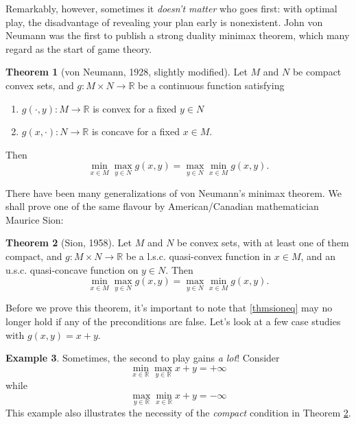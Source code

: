 \documentclass{article}
\numberwithin{equation}{section}
\theoremstyle{definition}
\newtheorem{theorem}{Theorem}[section]
\newtheorem{example}[theorem]{Example}
\newcommand{\bR}{\mathbb{R}}
\begin{document}
Remarkably, however, sometimes it \textit{doesn't matter} who goes first: with optimal play, the disadvantage of revealing your plan early is nonexistent. John von Neumann was the first to publish a strong duality minimax theorem, which many regard as the start of game theory.
\begin{theorem}[von Neumann, 1928, slightly modified]
    Let $M$ and $N$ be compact convex sets, and $g:M\times N\to\bR$ be a continuous function satisfying
    \begin{enumerate}[label=(\roman*)]
        \item $g(\cdot, y):M\to\bR$ is convex for a fixed $y\in N$
        \item $g(x, \cdot):N\to\bR$ is concave for a fixed $x\in M$.
    \end{enumerate}
    \vspace{0.8\baselineskip}Then
    \begin{equation}
        \min_{x\in M}\max_{y\in N} g(x,y)= \max_{y\in N}\min_{x\in M} g(x,y).
    \end{equation}
\end{theorem}
There have been many generalizations of von Neumann's minimax theorem. We shall prove one of the same flavour by American/Canadian mathematician Maurice Sion:
\begin{theorem}[Sion, 1958]
    \label{thmsion}
    Let $M$ and $N$ be convex sets, with at least one of them compact, and $g:M\times N\to\bR$ be a l.s.c. quasi-convex function in $x\in M$, and an u.s.c. quasi-concave function on $y\in N$. Then
    \begin{equation}
        \label{thmsioneq}
        \min_{x\in M}\max_{y\in N} g(x,y)= \max_{y\in N}\min_{x\in M} g(x,y).
    \end{equation}
\end{theorem}
Before we prove this theorem, it's important to note that \ref{thmsioneq} may no longer hold if any of the preconditions are false. Let's look at a few case studies with $g(x,y)=x+y$.
\begin{example}
    Sometimes, the second to play gains \textit{a lot}! Consider
    \begin{equation}
        \min_{x\in\bR}\max_{y\in\bR} x+y=+\infty
    \end{equation}
    while
    \begin{equation}
        \max_{y\in\bR}\min_{x\in\bR} x+y=-\infty
    \end{equation}
    This example also illustrates the necessity of the \textit{compact} condition in Theorem \ref{thmsion}.
\end{example}
\end{document}

